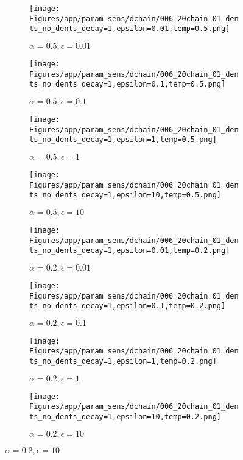 \documentclass{article}
\theoremstyle{plain}
\begin{document}
\begin{appendices}
\begin{figure}
                \begin{subfigure}[b]{0.24\textwidth}
                    \centering
                    \texttt{[image: Figures/app/param\_sens/dchain/006\_20chain\_01\_dents\_no\_dents\_decay=1,epsilon=0.01,temp=0.5.png]}
                    \caption*{$\alpha=0.5,\epsilon=0.01$}
                \end{subfigure}
                \begin{subfigure}[b]{0.24\textwidth}
                    \centering
                    \texttt{[image: Figures/app/param\_sens/dchain/006\_20chain\_01\_dents\_no\_dents\_decay=1,epsilon=0.1,temp=0.5.png]}
                    \caption*{$\alpha=0.5,\epsilon=0.1$}
                \end{subfigure}
                \begin{subfigure}[b]{0.24\textwidth}
                    \centering
                    \texttt{[image: Figures/app/param\_sens/dchain/006\_20chain\_01\_dents\_no\_dents\_decay=1,epsilon=1,temp=0.5.png]}
                    \caption*{$\alpha=0.5,\epsilon=1$}
                \end{subfigure}
                \begin{subfigure}[b]{0.24\textwidth}
                    \centering
                    \texttt{[image: Figures/app/param\_sens/dchain/006\_20chain\_01\_dents\_no\_dents\_decay=1,epsilon=10,temp=0.5.png]}
                    \caption*{$\alpha=0.5,\epsilon=10$}
                \end{subfigure}
                
                \begin{subfigure}[b]{0.24\textwidth}
                    \centering
                    \texttt{[image: Figures/app/param\_sens/dchain/006\_20chain\_01\_dents\_no\_dents\_decay=1,epsilon=0.01,temp=0.2.png]}
                    \caption*{$\alpha=0.2,\epsilon=0.01$}
                \end{subfigure}
                \begin{subfigure}[b]{0.24\textwidth}
                    \centering
                    \texttt{[image: Figures/app/param\_sens/dchain/006\_20chain\_01\_dents\_no\_dents\_decay=1,epsilon=0.1,temp=0.2.png]}
                    \caption*{$\alpha=0.2,\epsilon=0.1$}
                \end{subfigure}
                \begin{subfigure}[b]{0.24\textwidth}
                    \centering
                    \texttt{[image: Figures/app/param\_sens/dchain/006\_20chain\_01\_dents\_no\_dents\_decay=1,epsilon=1,temp=0.2.png]}
                    \caption*{$\alpha=0.2,\epsilon=1$}
                \end{subfigure}
                \begin{subfigure}[b]{0.24\textwidth}
                    \centering
                    \texttt{[image: Figures/app/param\_sens/dchain/006\_20chain\_01\_dents\_no\_dents\_decay=1,epsilon=10,temp=0.2.png]}
                    \caption*{$\alpha=0.2,\epsilon=10$}
                \end{subfigure}
                

\end{figure}
\end{appendices}
\end{document}
